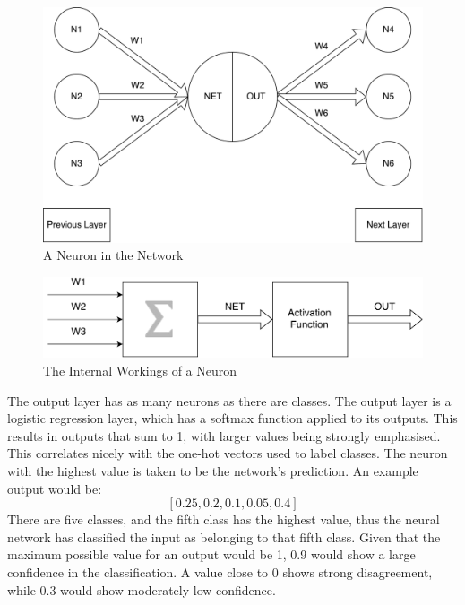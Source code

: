  \begin{figure}[!h]
 	\centering
 	\includegraphics[width=\textwidth]{figures/multilayer_perceptron_neuron}
 	\centering
 	\caption{A Neuron in the Network}
 	\label{fig:multi_neuron}
 \end{figure}

\begin{figure}[!h]
	\centering
	\includegraphics[width=\textwidth]{figures/multilayer_perceptron_neuron2}
	\centering
	\caption{The Internal Workings of a Neuron}
	\label{fig:multi_neuron_close}
\end{figure}
 
 
The output layer has as many neurons as there are classes. The output layer is a logistic regression layer, which has a softmax function applied to its outputs. This results in outputs that sum to 1, with larger values being strongly emphasised. This correlates nicely with the one-hot vectors used to label classes\cite{dunne1997pairing}. The neuron with the highest value is taken to be the network's prediction. An example output would be:
 \[ [0.25, 0.2, 0.1, 0.05, 0.4] \] 
There are five classes, and the fifth class has the highest value, thus the neural network has classified the input as belonging to that fifth class. Given that the maximum possible value for an output would be 1, 0.9 would show a large confidence in the classification. A value close to 0 shows strong disagreement, while 0.3 would show moderately low confidence.
 
